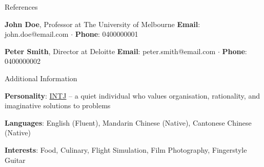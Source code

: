 \documentclass{cv}
\begin{document}
\pagebreak

\begin{cvsection}{References}
\item \textbf{John Doe}, Professor at The University of Melbourne \newline
\textbf{Email}: john.doe@email.com $\cdot$ \textbf{Phone}: 0400000001
\item \textbf{Peter Smith}, Director at Deloitte \newline
\textbf{Email}: peter.smith@email.com $\cdot$ \textbf{Phone}: 0400000002
\end{cvsection}

\begin{cvsection}{Additional Information}
\item \textbf{Personality}: \href{https://www.16personalities.com/intj-personality}{INTJ} -- a quiet individual who values organisation, rationality, and imaginative solutions to problems
\item \textbf{Languages}: English (Fluent), Mandarin Chinese (Native), Cantonese Chinese (Native)
\item \textbf{Interests}: Food, Culinary, Flight Simulation, Film Photography, Fingerstyle Guitar
\end{cvsection}
\end{document}

